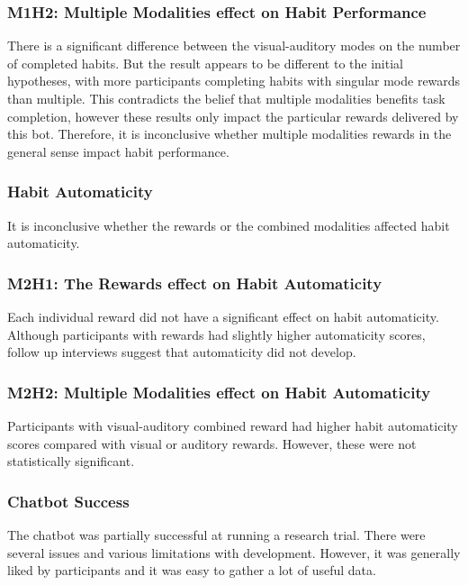 \subsubsection*{M1H2: Multiple Modalities effect on Habit Performance}
There is a significant difference between the visual-auditory modes on the number of completed habits. But the result appears to be different to the initial hypotheses, with more participants completing habits with singular mode rewards than multiple. This contradicts the belief that multiple modalities benefits task completion, however these results only impact the particular rewards delivered by this bot. Therefore, it is inconclusive whether multiple modalities rewards in the general sense impact habit performance.


\subsubsection{Habit Automaticity}
It is inconclusive whether the rewards or the combined modalities affected habit automaticity.

\subsubsection*{M2H1: The Rewards effect on Habit Automaticity}
Each individual reward did not have a significant effect on habit automaticity. Although participants with rewards had slightly higher automaticity scores, follow up interviews suggest that automaticity did not develop.

\subsubsection*{M2H2: Multiple Modalities effect on Habit Automaticity}
Participants with visual-auditory combined reward had higher habit automaticity scores compared with visual or auditory rewards. However, these were not statistically significant.


\subsubsection{Chatbot Success}
The chatbot was partially successful at running a research trial. There were several issues and various limitations with development. However, it was generally liked by participants and it was easy to gather a lot of useful data.

